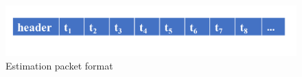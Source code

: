 \begin{figure}
	\centering
	\includegraphics[width=0.9\linewidth]{figs/packetformat.PNG}
	\caption{Estimation packet format}
	\label{fig:estimation packet format}
\end{figure}

